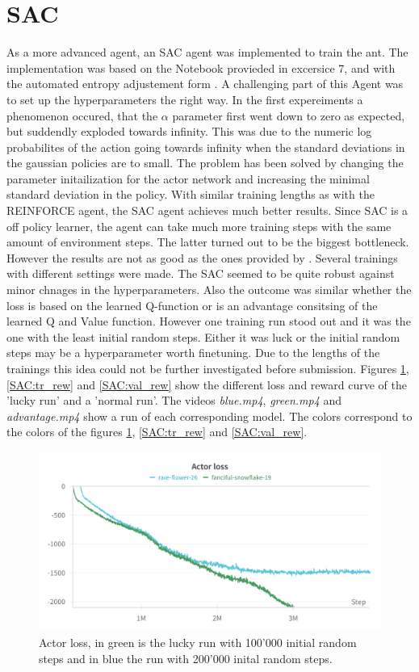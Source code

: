 \documentclass[11pt, a4paper]{article}
\begin{document}
\newpage
\section{SAC}
As a more advanced agent, an SAC agent was implemented to train the ant.
The implementation was based on the Notebook provieded in excersice 7, and \cite{haarnoja2018soft} with
the automated entropy adjustement form \cite{haarnoja2019soft}.
A challenging part of this Agent was to set up the hyperparameters the right way.
In the first expereiments a phenomenon occured, that the $\alpha$ parameter first went down to zero as
expected, but suddendly exploded towards infinity.
This was due to the numeric log probabilites of the action going towards infinity when the standard deviations
in the gaussian policies are to small.
The problem has been solved by changing the parameter initailization for the actor network and increasing the minimal
standard deviation in the policy.
With similar training lengths as with the REINFORCE agent, the SAC agent achieves much better results.
Since SAC is a off policy learner, the agent can take much more training steps with the same amount of environment steps.
The latter turned out to be the biggest bottleneck.
However the results are not as good as the ones provided by \cite{haarnoja2018soft}.
Several trainings with different settings were made.
The SAC seemed to be quite robust against minor chnages in the hyperparameters.
Also the outcome was similar whether the loss is based on the learned Q-function or
is an advantage consitsing of the learned Q and Value function.
However one training run stood out and it was the one with the least initial random steps.
Either it was luck or the initial random steps may be a hyperparameter worth finetuning.
Due to the lengths of the trainings this idea could not be further investigated before submission.
Figures \ref{SAC:acc_loss}, \ref{SAC:tr_rew} and \ref{SAC:val_rew} show the different loss and reward curve of the 
'lucky run' and a 'normal run'.
The videos \textit{blue.mp4}, \textit{green.mp4} and \textit{advantage.mp4} show a run of each corresponding model.
The colors correspond to the colors of the figures \ref{SAC:acc_loss}, \ref{SAC:tr_rew} and \ref{SAC:val_rew}.

\begin{figure}
    \centering
    \includegraphics[width=15cm]{SAC_actor_loss.png}
    \caption{Actor loss, in green is the lucky run with 100'000 initial random steps
    and in blue the run with 200'000 inital random steps.}
    \label{SAC:acc_loss}
\end{figure}
\end{document}
